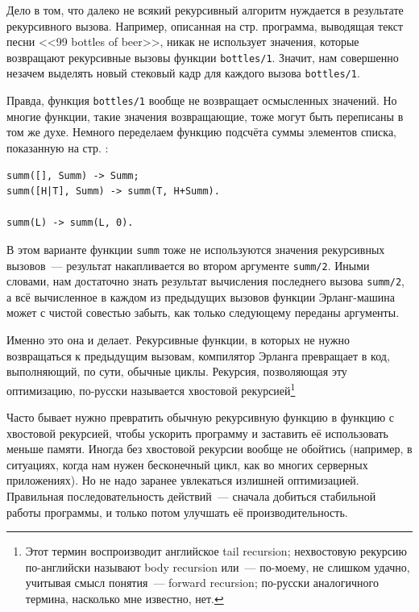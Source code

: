 \documentclass[
  paper=a4,
  fontsize=14pt,
  openany,
  appendixprefix=true
]{scrbook}
\begin{document}
Дело в том, что далеко не всякий рекурсивный алгоритм нуждается в результате рекурсивного вызова. Например, описанная на стр. \pageref{bottles} программа, выводящая текст песни <<99 bottles of beer>>, никак не использует значения, которые возвращают рекурсивные вызовы функции \lstinline{bottles/1}. Значит, нам совершенно незачем выделять новый стековый кадр для каждого вызова \lstinline{bottles/1}.

Правда, функция \lstinline{bottles/1} вообще не возвращает осмысленных значений. Но многие функции, такие значения возвращающие, тоже могут быть переписаны в том же духе. Немного переделаем функцию подсчёта суммы элементов списка, показанную на стр. \pageref{listsumm}:

\label{tailsumm}
\begin{lstlisting}
summ([], Summ) -> Summ;
summ([H|T], Summ) -> summ(T, H+Summ).

summ(L) -> summ(L, 0).
\end{lstlisting}

В этом варианте функции \lstinline{summ} тоже не используются значения рекурсивных вызовов~--- результат накапливается во втором аргументе \lstinline{summ/2}. Иными словами, нам достаточно знать результат вычисления последнего вызова \lstinline{summ/2}, а всё вычисленное в каждом из предыдущих вызовов функции Эрланг-машина может с чистой совестью забыть, как только следующему переданы аргументы.

Именно это она и делает. Рекурсивные функции, в которых не нужно возвращаться к предыдущим вызовам, компилятор Эрланга превращает в код, выполняющий, по сути, обычные циклы. Рекурсия, позволяющая эту оптимизацию, по-русски называется хвостовой рекурсией\footnote{Этот термин воспроизводит английское tail recursion; нехвостовую рекурсию по-английски называют body recursion или~--- по-моему, не слишком удачно, учитывая смысл понятия~--- forward recursion; по-русски аналогичного термина, насколько мне известно, нет.}

Часто бывает нужно превратить обычную рекурсивную функцию в функцию с хвостовой рекурсией, чтобы ускорить программу и заставить её использовать меньше памяти. Иногда без хвостовой рекурсии вообще не обойтись (например, в ситуациях, когда нам нужен бесконечный цикл, как во многих серверных приложениях). Но не надо заранее увлекаться излишней оптимизацией. Правильная последовательность действий~--- сначала добиться стабильной работы программы, и только потом улучшать её производительность.
\end{document}
